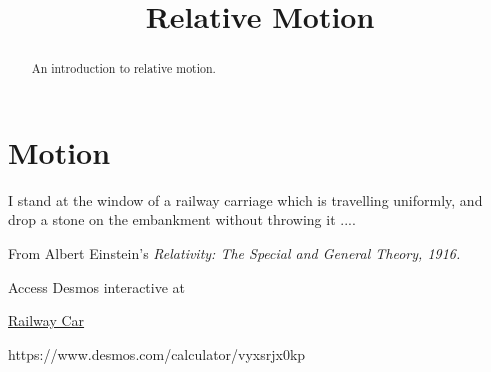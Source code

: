 \documentclass{ximera}
\title{Relative Motion}
\begin{document}
\begin{abstract}
An introduction to relative motion.
\end{abstract}
\maketitle

\section{Motion}

I stand at the window of a railway carriage which is travelling uniformly, and drop a stone on the embankment without throwing it ....

From Albert Einstein's \it{Relativity: The Special and General Theory}, 1916.


\begin{exploration} \label{Edsss4tDE}

Access Desmos interactive at
 
\href{https://www.desmos.com/calculator/vyxsrjx0kp}{Railway Car}

 
\begin{onlineOnly}
    \begin{center}
\end{center}
\end{onlineOnly}

https://www.desmos.com/calculator/vyxsrjx0kp
\end{exploration}
\end{document}
